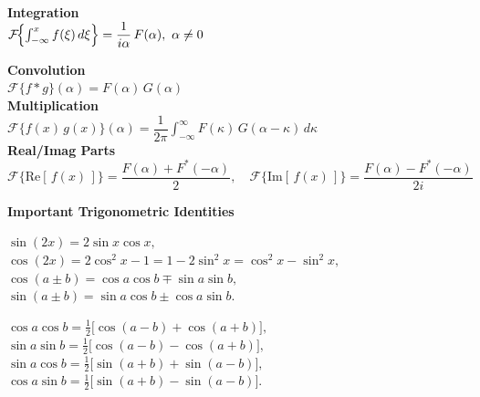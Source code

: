 \documentclass[8pt]{article}
\begin{document}
\begin{multicols}{2}
\begin{multicols}{2}
    \textbf{Integration} \\
    $\mathcal{F}\!\Bigl\{\int_{-\infty}^x f(\xi)\,d\xi\Bigr\}
        = \dfrac{1}{i \alpha}\,F(\alpha),\ \alpha\neq 0$

    \columnbreak

    \textbf{Convolution} \\
    $\mathcal{F}\{f * g\}(\alpha) = F(\alpha)\,G(\alpha)$\\

    \textbf{Multiplication} \\
    $\mathcal{F}\{f(x)\,g(x)\}(\alpha)
      = \dfrac{1}{2\pi}\!\int_{-\infty}^{\infty}
        F(\kappa)\,G(\alpha - \kappa)\,d\kappa$\\

    \textbf{Real/Imag Parts} \\
    $\mathcal{F}\{\text{Re}[\,f(x)\,]\}
      = \dfrac{F(\alpha) + F^*(-\alpha)}{2}, \quad
      \mathcal{F}\{\text{Im}[\,f(x)\,]\}
      = \dfrac{F(\alpha) - F^*(-\alpha)}{2i}$
\end{multicols}
\end{multicols}

\noindent \textbf{Important Trigonometric Identities}
\begin{multicols}{2}
\noindent
$\sin(2x) = 2\sin x\cos x,$\\
$\cos(2x) = 2\cos^2 x - 1 = 1 - 2\sin^2 x = \cos^2 x - \sin^2 x,$\\
$\cos(a \pm b) = \cos a\cos b \mp \sin a\sin b,$\\
$\sin(a \pm b) = \sin a\cos b \pm \cos a\sin b.$

\columnbreak

$\cos a\cos b = \tfrac{1}{2}\bigl[\cos(a - b) + \cos(a + b)\bigr],$ \\
$\sin a\sin b = \tfrac{1}{2}\bigl[\cos(a - b) - \cos(a + b)\bigr],$ \\
$\sin a\cos b = \tfrac{1}{2}\bigl[\sin(a + b) + \sin(a - b)\bigr],$ \\
$\cos a\sin b = \tfrac{1}{2}\bigl[\sin(a + b) - \sin(a - b)\bigr].$
\end{multicols}
\normalsize

\endgroup
\end{document}
